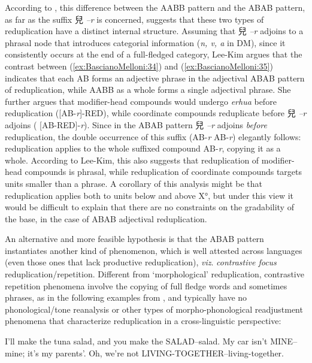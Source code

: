 \documentclass[output=paper]{langsci/langscibook}
\begin{document}
According to %
\citet{Lee-Kim2016}%
%
, this difference between the AABB pattern
and the ABAB pattern, as far as the suffix 兒 \emph{--r} is concerned,
suggests that these two types of reduplication have a distinct internal
structure. Assuming that 兒 \emph{--r} adjoins to a phrasal node that
introduces categorial information (\emph{n, v, a} in DM), since it
consistently occurs at the end of a full-fledged category, Lee-Kim
argues that the contrast between (\ref{ex:BascianoMelloni:34}) and (\ref{ex:BascianoMelloni:35}) indicates that each AB
forms an adjective phrase in the adjectival ABAB pattern of
reduplication, while AABB as a whole forms a single adjectival phrase.
She further argues that modifier-head compounds would undergo
\emph{erhua} before reduplication ({[}AB-\emph{r}{]}-RED), while
coordinate compounds reduplicate before 兒 \emph{--r} adjoins (
{[}AB-RED{]}-\emph{r}). Since in the ABAB pattern 兒 \emph{--r} adjoins
\emph{before} reduplication, the double occurrence of this suffix
(AB-\emph{r} AB-\emph{r}) elegantly follows: reduplication applies to
the whole suffixed compound AB-\emph{r}, copying it as a whole.
According to Lee-Kim, this also suggests that reduplication of
modifier-head compounds is phrasal, while reduplication of coordinate
compounds targets units smaller than a phrase. A corollary of this
analysis might be that reduplication applies both to units below and
above X°, but under this view it would be difficult to explain that
there are no constraints on the gradability of the base, in the case of
ABAB adjectival reduplication.

An alternative and more feasible hypothesis is that the ABAB pattern
instantiates another kind of phenomenon, which is well attested across
languages (even those ones that lack productive reduplication),
\emph{viz}. \emph{contrastive focus} reduplication/repetition. Different
from `morphological' reduplication, contrastive repetition phenomena
involve the copying of full fledge words and sometimes phrases, as in
the following examples from %
\citet[308]{GomeshiEtAl2004}%
%
, and
typically have no phonological/tone reanalysis or other types of
morpho-phonological readjustment phenomena that characterize
reduplication in a cross-linguistic perspective:

\ea\label{ex:BascianoMelloni:36}
\ea\label{ex:BascianoMelloni:36a} I'll make the tuna salad, and you make the SALAD--salad.
\ex\label{ex:BascianoMelloni:36b} My car isn't MINE--mine; it's my parents'.
\ex\label{ex:BascianoMelloni:36c} Oh, we're not LIVING-TOGETHER--living-together.
\z\z
\end{document}
